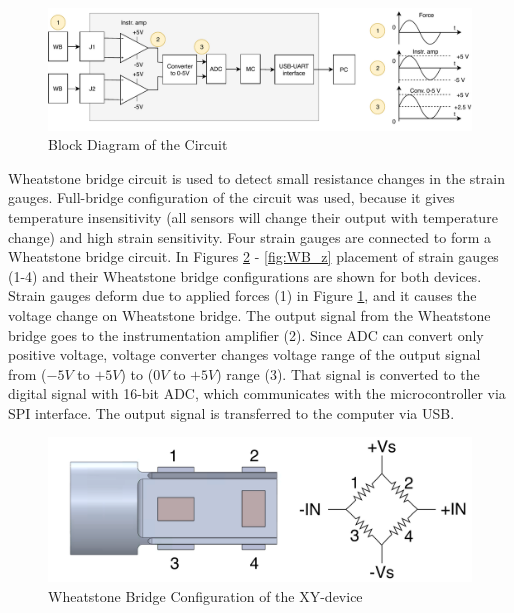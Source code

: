 \begin{figure}[h]
	\begin{center}
	\includegraphics[width=150mm]{fig/methods/PSC_block_wave.pdf}
	\end{center}
	\vspace{-4mm}
	\caption[Block Diagram of the Circuit]
	{Block Diagram of the Circuit}
	\label{fig:PCB_bd}
	\vspace{-2mm}
\end{figure}
Wheatstone bridge circuit is used to detect small resistance changes in the strain gauges. Full-bridge configuration of the circuit was used, because it gives temperature insensitivity (all sensors will change their output with temperature change) and high strain sensitivity. Four strain gauges are connected to form a Wheatstone bridge circuit. In Figures \ref{fig:WB_xy_dev} - \ref{fig:WB_z} placement of strain gauges (1-4) and their Wheatstone bridge configurations are shown for both devices. Strain gauges deform due to applied forces (1) in Figure \ref{fig:PCB_bd}, and it causes the voltage change on Wheatstone bridge. The output signal from the Wheatstone bridge goes to the instrumentation amplifier (2). Since ADC can convert only positive voltage, voltage converter changes voltage range of the output signal from ($-5V$ to $+5V$) to ($0V$ to $+5V$) range (3). That signal is converted to the digital signal with 16-bit ADC, which communicates with the microcontroller via SPI interface. The output signal is transferred to the computer via USB. 
	
\begin{figure}[h]
	\begin{center}
		\includegraphics[width=120mm]{fig/methods/Wiring_xy_sleeve.pdf}
	\end{center}
	\vspace{-4mm}
	\caption[Wheatstone Bridge Configuration of the XY-device]
	{Wheatstone Bridge Configuration of the XY-device}
	\label{fig:WB_xy_dev}
	\vspace{-2mm}
\end{figure}


